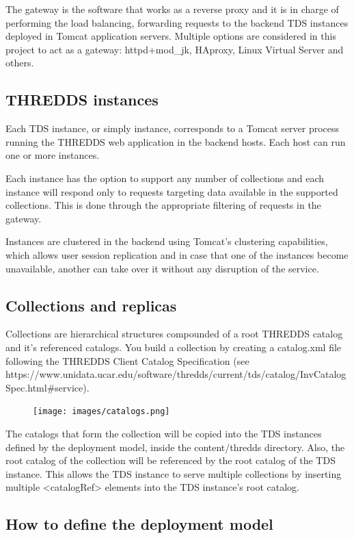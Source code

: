 \documentclass[a4paper,12pt]{article}
\begin{document}
The gateway is the software that works as a reverse proxy and it is in charge of performing the load balancing, forwarding requests to the backend TDS instances deployed in Tomcat application servers. Multiple options are considered in this project to act as a gateway: httpd+mod\_jk, HAproxy, Linux Virtual Server and others.

\subsection{THREDDS instances}

Each TDS instance, or simply instance, corresponds to a Tomcat server process running the THREDDS web application in the backend hosts. Each host can run one or more instances. 

Each instance has the option to support any number of collections and each instance will respond only to requests targeting data available in the supported collections. This is done through the appropriate filtering of requests in the gateway.

Instances are clustered in the backend using Tomcat's clustering capabilities, which allows user session replication and in case that one of the instances become unavailable, another can take over it without any disruption of the service.

\subsection{Collections and replicas}

Collections are hierarchical structures compounded of a root THREDDS catalog and it's referenced catalogs. You build a collection by creating a catalog.xml file following the THREDDS Client Catalog Specification (see https://www.unidata.ucar.edu/software/thredds/current/tds/catalog/InvCatalogSpec.html#service).

\begin{figure}[h]
\texttt{[image: images/catalogs.png]}
\end{figure}

The catalogs that form the collection will be copied into the TDS instances defined by the deployment model, inside the content/thredds directory. Also, the root catalog of the collection will be referenced by the root catalog of the TDS instance. This allows the TDS instance to serve multiple collections by inserting multiple <catalogRef> elements into the TDS instance's root catalog.

\subsection{How to define the deployment model}
\end{document}
